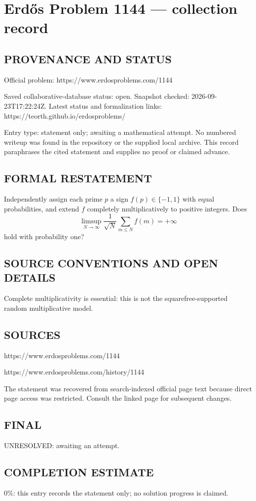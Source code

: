 \section*{Erd\H{o}s Problem 1144 --- collection record}

\subsection*{PROVENANCE AND STATUS}
Official problem: https://www.erdosproblems.com/1144

Saved collaborative-database status: open.
Snapshot checked: 2026-09-23T17:22:24Z.
Latest status and formalization links: https://teorth.github.io/erdosproblems/

Entry type: statement only; awaiting a mathematical attempt. No numbered writeup was found in the repository or the supplied local archive. This record paraphrases the cited statement and supplies no proof or claimed advance.

\subsection*{FORMAL RESTATEMENT}
Independently assign each prime $p$ a sign $f(p)\in\{-1,1\}$ with equal probabilities, and extend $f$ completely multiplicatively to positive integers. Does
\[
\limsup_{N\to\infty}\frac{1}{\sqrt N}\sum_{m\leq N}f(m)=+\infty
\]
hold with probability one?

\subsection*{SOURCE CONVENTIONS AND OPEN DETAILS}
Complete multiplicativity is essential: this is not the squarefree-supported random multiplicative model.

\subsection*{SOURCES}
https://www.erdosproblems.com/1144

https://www.erdosproblems.com/history/1144

The statement was recovered from search-indexed official page text because direct page access was restricted. Consult the linked page for subsequent changes.

\subsection*{FINAL}
UNRESOLVED: awaiting an attempt.

\subsection*{COMPLETION ESTIMATE}
$0\%$: this entry records the statement only; no solution progress is claimed.
